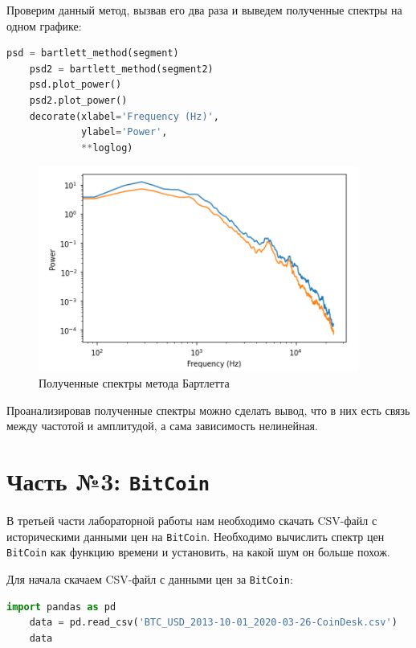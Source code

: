 \documentclass[a4paper]{article}
\begin{document}
           Проверим данный метод, вызвав его два раза и выведем полученные спектры на одном графике:
           
\begin{lstlisting}[language=Python, caption= Получение спектограммы для сегмента]
    psd = bartlett_method(segment)
    psd2 = bartlett_method(segment2)
    psd.plot_power()
    psd2.plot_power()
    decorate(xlabel='Frequency (Hz)', 
             ylabel='Power', 
             **loglog)
\end{lstlisting}               
            
            \begin{figure}[H]
                \centering
                \includegraphics{ex_2_bartlett_spectr.png}
                \caption{Полученные спектры метода Бартлетта}
                \label{fig:ex_2_bartlett_spectr}
            \end{figure}
            
            Проанализировав полученные спектры можно сделать вывод, что в них есть связь между частотой и амплитудой, а сама зависимость нелинейная.

    \newpage
        \section{Часть №3: \texttt{BitCoin}}
            В третьей части лабораторной работы нам необходимо скачать CSV-файл с историческими данными цен на \texttt{BitCoin}. Необходимо вычислить спектр цен \texttt{BitCoin} как функцию времени и установить, на какой шум он больше похож.
            
            Для начала скачаем  CSV-файл с данными цен за \texttt{BitCoin}:
            
\begin{lstlisting}[language=Python, caption= Получение таблицы с данными цен за \texttt{BitCoin}]
    import pandas as pd
    data = pd.read_csv('BTC_USD_2013-10-01_2020-03-26-CoinDesk.csv')
    data
\end{lstlisting}               
            
\end{document}
